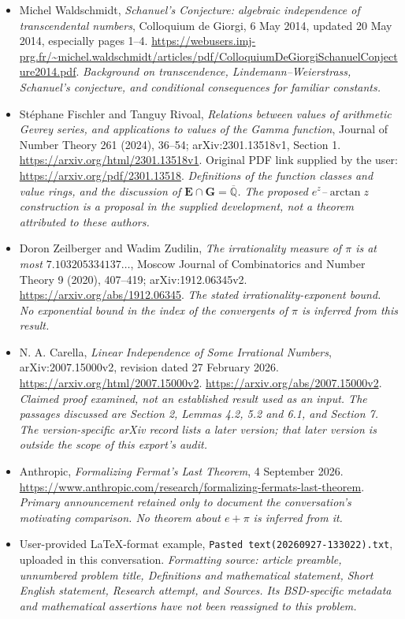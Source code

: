 \documentclass[11pt]{article}
\newcommand{\Qbar}{\overline{\mathbb Q}}
\begin{document}
\begin{itemize}
 \item[E5] Michel Waldschmidt, \emph{Schanuel's Conjecture: algebraic
 independence of transcendental numbers}, Colloquium de Giorgi,
 6 May 2014, updated 20 May 2014, especially pages 1--4.
 \url{https://webusers.imj-prg.fr/~michel.waldschmidt/articles/pdf/ColloquiumDeGiorgiSchanuelConjecture2014.pdf}.
 \textit{Background on transcendence, Lindemann--Weierstrass, Schanuel's
 conjecture, and conditional consequences for familiar constants.}

 \item[E6] St\'ephane Fischler and Tanguy Rivoal,
 \emph{Relations between values of arithmetic Gevrey series, and
 applications to values of the Gamma function}, Journal of Number Theory
 261 (2024), 36--54; arXiv:2301.13518v1, Section 1.
 \url{https://arxiv.org/html/2301.13518v1}.
 Original PDF link supplied by the user:
 \url{https://arxiv.org/pdf/2301.13518}.
 \textit{Definitions of the function classes and value rings, and the
 discussion of $\mathbf E\cap\mathbf G=\Qbar$. The proposed
 $e^z$--$\arctan z$ construction is a proposal in the supplied development,
 not a theorem attributed to these authors.}

 \item[E7] Doron Zeilberger and Wadim Zudilin,
 \emph{The irrationality measure of $\pi$ is at most
 $7.103205334137\ldots$}, Moscow Journal of Combinatorics and Number Theory
 9 (2020), 407--419; arXiv:1912.06345v2.
 \url{https://arxiv.org/abs/1912.06345}.
 \textit{The stated irrationality-exponent bound. No exponential bound in
 the index of the convergents of $\pi$ is inferred from this result.}

 \item[D1] N. A. Carella, \emph{Linear Independence of Some Irrational
 Numbers}, arXiv:2007.15000v2, revision dated 27 February 2026.
 \url{https://arxiv.org/html/2007.15000v2}.
 \url{https://arxiv.org/abs/2007.15000v2}.
 \textit{Claimed proof examined, not an established result used as an
 input. The passages discussed are Section 2, Lemmas 4.2, 5.2 and 6.1,
 and Section 7. The version-specific arXiv record lists a later version;
 that later version is outside the scope of this export's audit.}

 \item[C1] Anthropic, \emph{Formalizing Fermat's Last Theorem},
 4 September 2026.
 \url{https://www.anthropic.com/research/formalizing-fermats-last-theorem}.
 \textit{Primary announcement retained only to document the conversation's
 motivating comparison. No theorem about $e+\pi$ is inferred from it.}

 \item[M1] User-provided LaTeX-format example,
 \texttt{Pasted text(20260927-133022).txt}, uploaded in this conversation.
 \textit{Formatting source: article preamble, unnumbered problem title,
 Definitions and mathematical statement, Short English statement,
 Research attempt, and Sources. Its BSD-specific metadata and mathematical
 assertions have not been reassigned to this problem.}
\end{itemize}
\end{document}
